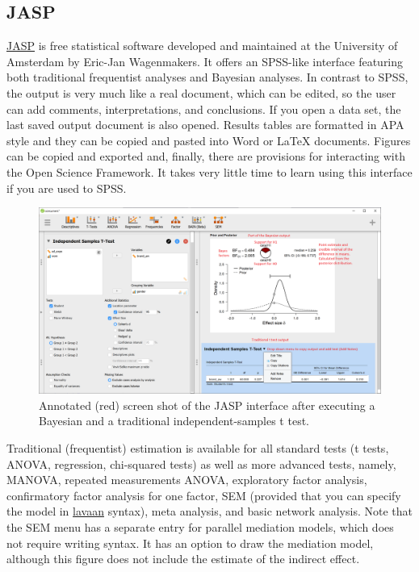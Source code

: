 \documentclass[doc]{apa6}
\begin{document}
\subsection{JASP}\label{jasp}

\href{https://jasp-stats.org/}{JASP} is free statistical software
developed and maintained at the University of Amsterdam by Eric-Jan
Wagenmakers. It offers an SPSS-like interface featuring both traditional
frequentist analyses and Bayesian analyses. In contrast to SPSS, the
output is very much like a real document, which can be edited, so the
user can add comments, interpretations, and conclusions. If you open a
data set, the last saved output document is also opened. Results tables
are formatted in APA style and they can be copied and pasted into Word
or LaTeX documents. Figures can be copied and exported and, finally,
there are provisions for interacting with the Open Science Framework. It
takes very little time to learn using this interface if you are used to
SPSS.

\begin{figure}[H]
\includegraphics[width=1\linewidth]{JASP} \caption{Annotated (red) screen shot of the JASP interface after executing a Bayesian and a traditional independent-samples t test.}\label{fig:JASPscreenshot}
\end{figure}

Traditional (frequentist) estimation is available for all standard tests
(t tests, ANOVA, regression, chi-squared tests) as well as more advanced
tests, namely, MANOVA, repeated measurements ANOVA, exploratory factor
analysis, confirmatory factor analysis for one factor, SEM (provided
that you can specify the model in \href{http://lavaan.ugent.be/}{lavaan}
syntax), meta analysis, and basic network analysis. Note that the SEM
menu has a separate entry for parallel mediation models, which does not
require writing syntax. It has an option to draw the mediation model,
although this figure does not include the estimate of the indirect
effect.
\end{document}
